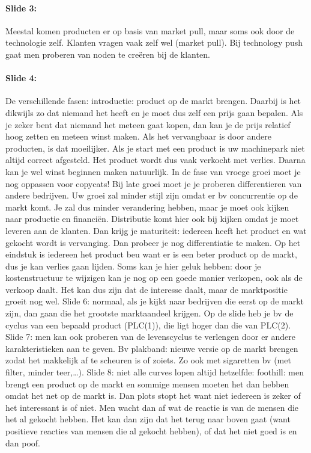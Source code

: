 \documentclass[10pt,a4paper]{report}
\begin{document}
\paragraph{Slide 3:} Meestal komen producten er op basis van market pull, maar soms ook door de technologie zelf. Klanten vragen vaak zelf wel (market pull). Bij technology push gaat men proberen van noden te cre\"eren bij de klanten.

\paragraph{Slide 4:} De verschillende fasen: introductie: product op de markt brengen. Daarbij is het dikwijls zo dat niemand het heeft en je moet dus zelf een prijs gaan bepalen. Als je zeker bent dat niemand het meteen gaat kopen, dan kan je de prijs relatief hoog zetten en meteen winst maken. Als het vervangbaar is door andere producten, is dat moeilijker. Als je start met een product is uw machinepark niet altijd correct afgesteld. Het product wordt dus vaak verkocht met verlies. Daarna kan je wel winst beginnen maken natuurlijk. In de fase van vroege groei moet je nog oppassen voor copycats! Bij late groei moet je je proberen differentieren van andere bedrijven. Uw groei zal minder stijl zijn omdat er bv concurrentie op de markt komt. Je zal dus minder verandering hebben, maar je moet ook kijken naar productie en financiën. Distributie komt hier ook bij kijken omdat je moet leveren aan de klanten. Dan krijg je maturiteit: iedereen heeft het product en wat gekocht wordt is vervanging. Dan probeer je nog differentiatie te maken. Op het eindstuk is iedereen het product beu want er is een beter product op de markt, dus je kan verlies gaan lijden. Soms kan je hier geluk hebben: door je kostenstructuur te wijzigen kan je nog op een goede manier verkopen, ook als de verkoop daalt. Het kan dus zijn dat de interesse daalt, maar de marktpositie groeit nog wel.
Slide 6: normaal, als je kijkt naar bedrijven die eerst op de markt zijn, dan gaan die het grootste marktaandeel krijgen. Op de slide heb je bv de cyclus van een bepaald product (PLC(1)), die ligt hoger dan die van PLC(2). 
Slide 7: men kan ook proberen van de levenscyclus te verlengen door er andere karakteristieken aan te geven. Bv plakband: nieuwe versie op de markt brengen zodat het makkelijk af te scheuren is of zoiets. Zo ook met sigaretten bv (met filter, minder teer,…).
Slide 8: niet alle curves lopen altijd hetzelfde: foothill: men brengt een product op de markt en sommige mensen moeten het dan hebben omdat het net op de markt is. Dan plots stopt het want niet iedereen is zeker of het interessant is of niet. Men wacht dan af wat de reactie is van de mensen die het al gekocht hebben. Het kan dan zijn dat het terug naar boven gaat (want positieve reacties van mensen die al gekocht hebben), of dat het niet goed is en dan poof.
\end{document}
